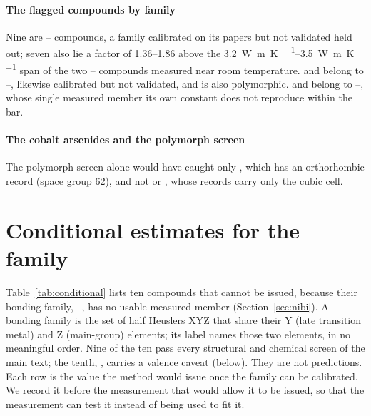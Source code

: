 \documentclass[preprint, 12pt]{elsarticle}
\begin{document}
\paragraph{The flagged compounds by family} Nine are -- compounds, a family calibrated
on its papers but not validated held out; seven also lie a factor of \numrange{1.36}{1.86} above
the \SIrange{3.2}{3.5}{\watt\per\meter\per\kelvin} span of the two -- compounds
measured near room temperature.  and  belong to --, likewise
calibrated but not validated, and  is also polymorphic.  and 
belong to --, whose single measured member its own constant does not reproduce
within the bar.

\paragraph{The cobalt arsenides and the polymorph screen} The polymorph screen alone would have
caught only , which has an orthorhombic record (space group 62), and not  or
, whose records carry only the cubic cell.

\section{Conditional estimates for the \texorpdfstring{--}{Ni-Bi} family}
\label{sec:conditional}

Table~\ref{tab:conditional} lists ten compounds that cannot be issued, because their bonding family,
--, has no usable measured member (Section~\ref{sec:nibi}). A bonding family is the set
of half Heuslers XYZ that share their Y (late transition metal) and Z (main-group) elements; its
label names those two elements, in no meaningful order. Nine of the ten pass every structural and
chemical screen of the main text; the tenth, , carries a valence caveat (below). They are not
predictions. Each row is the value the method would issue once the family can be calibrated. We
record it before the measurement that would allow it to be issued, so that the measurement can test
it instead of being used to fit it.
\end{document}
